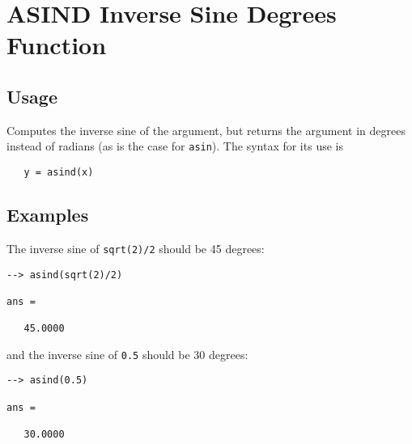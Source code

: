 \section{ASIND Inverse Sine Degrees Function}

\subsection{Usage}

Computes the inverse sine of the argument, but returns
the argument in degrees instead of radians (as is the case
for \verb|asin|). The syntax for its use is
\begin{verbatim}
   y = asind(x)
\end{verbatim}
\subsection{Examples}

The inverse sine of \verb|sqrt(2)/2| should be 45 degrees:
\begin{verbatim}
--> asind(sqrt(2)/2)

ans = 

   45.0000 
\end{verbatim}
and the inverse sine of \verb|0.5| should be 30 degrees:
\begin{verbatim}
--> asind(0.5)

ans = 

   30.0000 
\end{verbatim}
